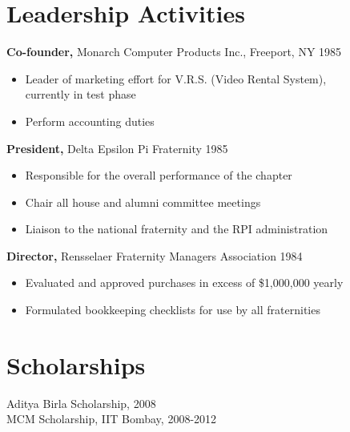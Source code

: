 \documentclass[margin]{res}
\begin{document}
\begin{resume}
\begin{itemize}
     \end{itemize}

\section{Leadership   Activities}
               {\bf Co-founder,} Monarch Computer Products Inc., Freeport, NY    \hfill         1985
                \begin{itemize} \itemsep -2pt
              \item Leader of marketing effort for V.R.S. (Video
                 Rental System), \\
                  currently in test phase

                \item  Perform accounting duties

     \end{itemize}

    {\bf President,} Delta Epsilon Pi Fraternity \hfill   1985
                \begin{itemize} \itemsep -2pt
                 \item  Responsible for the overall performance of the
                 chapter

                 \item Chair all house and alumni committee meetings

                 \item Liaison to the national fraternity and the RPI
                 administration
     \end{itemize}

                  {\bf  Director,}  Rensselaer Fraternity Managers
              Association     \hfill                                 1984
                 \begin{itemize} \itemsep -2pt

               \item    Evaluated and approved purchases in excess of
                 {\$}1,000,000 yearly

               \item  Formulated bookkeeping checklists for use by all
                 fraternities
     \end{itemize}

\section{Scholarships}
Aditya Birla Scholarship, 2008 \\
MCM Scholarship, IIT Bombay, 2008-2012 \\



\end{resume}
\end{document}
